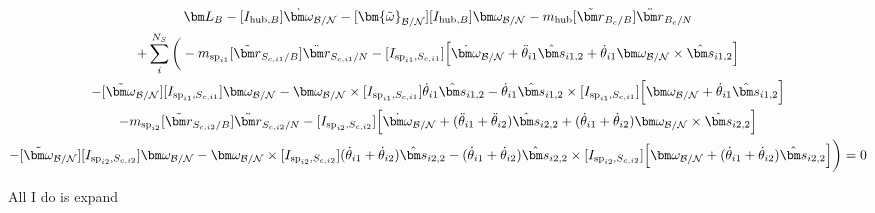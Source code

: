 \documentclass[paper]{aiaaNew}
\begin{document}
\begin{multline}
\bm L_B -[I_{\text{hub},B}] \dot{\bm\omega}_{\cal B/N}  -[\bm{\tilde{\omega}}_{\cal B/N}] [I_{\text{hub},B}] \bm\omega_{\cal B/N} - m_{\text{hub}} [\tilde{{\bm r}}_{B_c/B}] \ddot{\bm r}_{B_c/N} \\
+ \sum\limits_{i}^{N_S}\bigg(- m_{\text{sp}_{i1}} [\tilde{{\bm r}}_{S_{c,i1}/B}] \ddot{\bm r}_{S_{c,i1}/N} -[I_{\text{sp}_{i1},S_{c,i1}}] \Big[\dot{\bm \omega}_{\cal{B/N}} + \ddot{\theta}_{i1} \hat{\bm s}_{i1,2} + \dot{\theta}_{i1} \bm \omega_{\cal{B/N}} \times \hat{\bm s}_{i1,2}\Big]  \\
-[\tilde{\bm \omega}_{\cal{B/N}}] [I_{\text{sp}_{i1},S_{c,i1}}] \bm \omega_{\cal{B/N}} -\bm \omega_{\cal{B/N}} \times [I_{\text{sp}_{i1},S_{c,i1}}] \dot{\theta}_{i1} \hat{\bm s}_{i1,2} -\dot{\theta}_{i1} \hat{\bm s}_{i1,2} \times [I_{\text{sp}_{i1},S_{c,i1}}] \Big[\bm \omega_{\cal{B/N}} + \dot{\theta}_{i1} \hat{\bm s}_{i1,2}\Big]\\
- m_{\text{sp}_{i2}} [\tilde{{\bm r}}_{S_{c,i2}/B}] \ddot{\bm r}_{S_{c,i2}/N} -[I_{\text{sp}_{i2},S_{c,i2}}] \Big[\dot{\bm \omega}_{\cal{B/N}} + (\ddot{\theta}_{i1}  + \ddot{\theta}_{i2})\hat{\bm s}_{i2,2} + (\dot{\theta}_{i1}  + \dot{\theta}_{i2}) \bm \omega_{\cal{B/N}} \times \hat{\bm s}_{i2,2}\Big]  \\
-[\tilde{\bm \omega}_{\cal{B/N}}] [I_{\text{sp}_{i2},S_{c,i2}}] \bm \omega_{\cal{B/N}} -\bm \omega_{\cal{B/N}} \times [I_{\text{sp}_{i2},S_{c,i2}}] (\dot{\theta}_{i1}  + \dot{\theta}_{i2})\hat{\bm s}_{i2,2} -(\dot{\theta}_{i1}  + \dot{\theta}_{i2})\hat{\bm s}_{i2,2} \times [I_{\text{sp}_{i2},S_{c,i2}}] \Big[\bm \omega_{\cal{B/N}} + (\dot{\theta}_{i1}  + \dot{\theta}_{i2})\hat{\bm s}_{i2,2}\Big]\bigg) = 0
\end{multline}

All I do is expand
\end{document}
